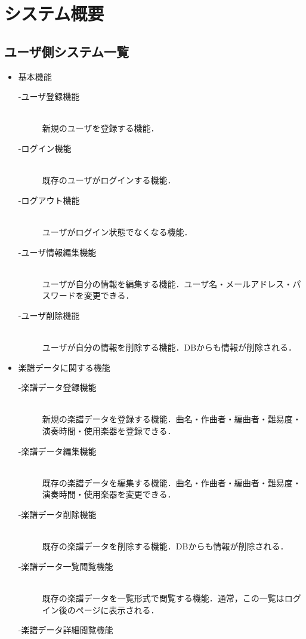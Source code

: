 \chapter{システム概要}
\vspace{-1cm}
\section{ユーザ側システム一覧}
\begin{itemize}
	\item 基本機能
	      \begin{description}
		      \item[-ユーザ登録機能]\mbox{}\\
		      新規のユーザを登録する機能．
		      \item[-ログイン機能] \mbox{}\\
			      既存のユーザがログインする機能．
		      \item[-ログアウト機能] \mbox{}\\
			      ユーザがログイン状態でなくなる機能．
		      \item[-ユーザ情報編集機能] \mbox{}\\
			      ユーザが自分の情報を編集する機能．ユーザ名・メールアドレス・パスワードを変更できる．
		      \item[-ユーザ削除機能] \mbox{}\\
			      ユーザが自分の情報を削除する機能．DBからも情報が削除される．
	      \end{description}
	\item 楽譜データに関する機能
	      \begin{description}
		      \item[-楽譜データ登録機能] \mbox{}\\
			      新規の楽譜データを登録する機能．曲名・作曲者・編曲者・難易度・演奏時間・使用楽器を登録できる．
		      \item[-楽譜データ編集機能] \mbox{}\\
			      既存の楽譜データを編集する機能．曲名・作曲者・編曲者・難易度・演奏時間・使用楽器を変更できる．
		      \item[-楽譜データ削除機能] \mbox{}\\
			      既存の楽譜データを削除する機能．DBからも情報が削除される．
		      \item[-楽譜データ一覧閲覧機能] \mbox{}\\
			      既存の楽譜データを一覧形式で閲覧する機能．通常，この一覧はログイン後のページに表示される．
		      \item[-楽譜データ詳細閲覧機能] \mbox{}\\

\end{description}
\end{itemize}
